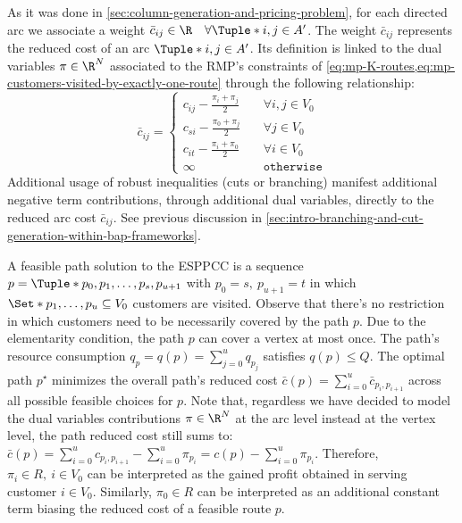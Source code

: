 As it was done in \cref{sec:column-generation-and-pricing-problem},
for each directed arc we associate a weight
$\bar{c}_{ij} \in \R \quad \forall \Tuple*{i, j} \in A^\prime$.
The weight $\bar{c}_{ij}$ represents the reduced cost of an arc $\Tuple*{i, j} \in A^\prime$.
Its definition is linked to the dual variables $\pi \in \R^N$ associated to
the RMP's constraints of \cref{eq:mp-K-routes,eq:mp-customers-visited-by-exactly-one-route}
through the following relationship:
\begin{equation}
	\bar{c}_{ij} = \begin{cases}
		c_{ij} - \frac{\pi_i + \pi_j}{2} & \quad \forall i, j \in V_0 \\
		c_{si} - \frac{\pi_0 + \pi_j}{2} & \quad \forall j \in V_0    \\
		c_{it} - \frac{\pi_i + \pi_0}{2} & \quad \forall i \in V_0    \\
		\infty                           & \quad \texttt{otherwise}
	\end{cases}
\end{equation}
Additional usage of robust inequalities (cuts or branching) manifest
additional negative term contributions, through additional dual variables,
directly to the reduced arc cost $\bar{c}_{ij}$.
See previous discussion in \cref{sec:intro-branching-and-cut-generation-within-bap-frameworks}.

A feasible path solution to the ESPPCC is a sequence $p = \Tuple*{p_0, p_1, \dots, p_s, p_{u+1}}$
with $p_0 = s, \ p_{u + 1} = t$
in which $\Set*{p_1, \dots, p_u} \subseteq V_0$ customers are visited.
Observe that there's no restriction in which customers need to be necessarily covered
by the path $p$.
Due to the elementarity condition, the path $p$ can cover a vertex at most once.
The path's resource consumption $q_p = q(p) = \sum_{j=0}^{u} q_{p_j}$
satisfies $q(p) \le Q$.
The optimal path $p^\star$ minimizes the overall path's reduced cost
$\bar{c}(p) = \sum_{i=0}^{u} \bar{c}_{p_i,p_{i+1}}$ across all
possible feasible choices for $p$.
Note that, regardless we have decided to model
the dual variables contributions $\pi \in \R^N$
at the arc level instead at the vertex level,
the path reduced cost still sums to:
$\bar{c}(p) = \sum_{i=0}^{u} c_{p_i,p_{i+1}} - \sum_{i=0}^{u} \pi_{p_i} = c(p) - \sum_{i=0}^{u} \pi_{p_i}$.
Therefore, $\pi_i \in R,\ i \in V_0$ can be interpreted as the
gained profit obtained in serving customer $i \in V_0$.
Similarly,
$\pi_0 \in R$ can be interpreted as an additional constant term
biasing the reduced cost of a feasible route $p$.

